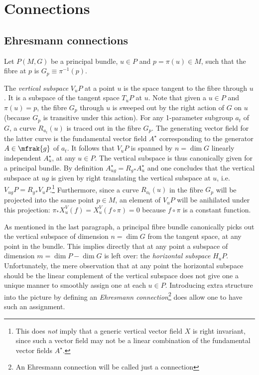 \documentclass[10pt,reqno]{amsart}
\numberwithin{equation}{section}
\begin{document}
\section{Connections}

\subsection{Ehresmann connections}

Let $P(M,G)$ be a principal bundle, $u \in P$ and $p = \pi(u) \in 
M$, such that the fibre at $p$ is $G_p \equiv \pi^{-1}(p)$.

The \emph{vertical subspace} $V_u P$ at a point $u$ is the space 
tangent to the fibre through $u$. It is a subspace of the tangent 
space $T_u P$ at $u$. Note that given a $u \in P$ and $\pi(u) = 
p$, the fibre $G_p$ through $u$ is sweeped out by the right 
action of $G$ on $u$ (because $G_p$ is transitive under this 
action). For any 1-parameter subgroup $a_t$ of $G$, a curve 
$R_{a_t}(u)$ is traced out in the fibre $G_p$.  The generating 
vector field for the latter curve is the fundamental vector field 
$A^\star$ corresponding to the generator $A \in \mfrak{g}$ of 
$a_t$. It follows that $V_u P$ is spanned by $n = \dim G$ 
linearly independent $A^\star _u$, at any $u \in P$.  The 
vertical subspace is thus canonically given for a principal 
bundle. By definition $A^\star_{ug} = R_g{}_\ast A^\star_u$ and 
one concludes that the vertical subspace at $ug$ is given by 
right translating the vertical subspace at $u$, i.e.\ $V_{ug}P = 
R_g{}_\ast V_u P$.\footnote{This does \emph{not} imply that a 
	generic vertical vector field $X$ is right invariant, since 
	such a vector field may not be a linear combination of the 
	fundamental vector fields $A^\star$.}
Furthermore, since a curve $R_{a_t}(u)$ in the fibre $G_p$ will 
be projected into the same point $p \in M$, an element of $V_u P$ 
will be anihilated under this projection: $\pi_\ast X^V_u(f) = 
X^V_u (f \circ \pi) = 0$ because $f \circ \pi$ is a constant 
function.

As mentioned in the last paragraph, a principal fibre bundle 
canonically picks out the vertical subspace of dimension $n = 
\dim G$ from the tangent space, at any point in the bundle. This 
implies directly that at any point a subspace of dimension $m = 
\dim P - \dim G$ is left over: the \emph{horizontal subspace} 
$H_u P$. Unfortunately, the mere observation that at any point 
the horizontal subspace should be the linear complement of the 
vertical subspace does not give one a unique manner to smoothly 
assign one at each $u \in P$. Introducing extra structure into 
the picture by defining an \emph{Ehresmann 
	connection}\footnote{An Ehresmann connection will be called 
	just a connection} does allow one to have such an assignment.
\end{document}

